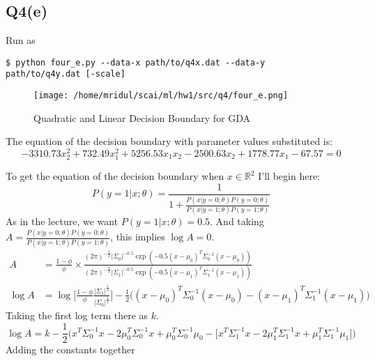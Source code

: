 \documentclass[11pt]{article}
\begin{document}
\subsection{Q4(e)}
\label{sec:org88a0269}
\begin{codebox}
Run as
\begin{verbatim}
$ python four_e.py --data-x path/to/q4x.dat --data-y
path/to/q4y.dat [-scale]
\end{verbatim}
\end{codebox}
\begin{figure}[!ht]
\centering
\texttt{[image: /home/mridul/scai/ml/hw1/src/q4/four\_e.png]}
\caption{\label{fig:orgb252f3d}Quadratic and Linear Decision Boundary for GDA}
\end{figure}
The equation of the decision boundary with parameter values substituted is:
\begin{equation*}
-3310.73x_2^2 + 732.49x_1^2 + 5256.53x_1x_2 - 2500.63x_2 + 1778.77x_1 - 67.57 =0
\end{equation*}
\par
To get the equation of the decision boundary when
\(x\in\mathbb{R}^2\) I'll begin here:
\begin{equation}
P(y=1|x;\theta)=\frac{1}{1+\frac{P(x|y=0;\theta)P(y=0;\theta)}{P(x|y=1;\theta)P(y=1;\theta)}}
\end{equation}
As in the lecture, we want \(P(y=1|x;\theta)=0.5\). And taking
\(A=\frac{P(x|y=0;\theta)P(y=0;\theta)}{P(x|y=1;\theta)P(y=1;\theta)}\),
this implies \(\log A=0\).
\begin{align*}
A &=
\frac{1-\phi}{\phi}\times\frac{(2\pi)^{-\frac{n}{2}}\lvert\Sigma_0\rvert^{-0.5}\exp(-0.5(x-\mu_0)^T\Sigma^{-1}_0(x-\mu_0))}{(2\pi)^{-\frac{n}{2}}\lvert\Sigma_1\rvert^{-0.5}\exp(-0.5(x-\mu_1)^T\Sigma^{-1}_1(x-\mu_1))}\\
\log A &= \log\Biggl[\frac{1-\phi}{\phi}\frac{\lvert\Sigma_1\rvert^{\frac{1}{2}}}{\lvert\Sigma_0\rvert^{\frac{1}{2}}}\Biggr]-\frac{1}{2}\bigl((x-\mu_0)^T\Sigma^{-1}_0(x-\mu_0)-(x-\mu_1)^T\Sigma^{-1}_1(x-\mu_1)\bigr)
\end{align*}
Taking the first log term there as \(k\).
\begin{equation*}
\log A = k - \frac{1}{2}\bigl(
x^T\Sigma^{-1}_0x-2\mu_0^T\Sigma^{-1}_0x+\mu_0^T\Sigma^{-1}_0\mu_0
-\bigl[
x^T\Sigma^{-1}_1x-2\mu_1^T\Sigma^{-1}_1x+\mu_1^T\Sigma^{-1}_1\mu_1
\bigr]
\bigr)
\end{equation*}
Adding the constants together
\end{document}
